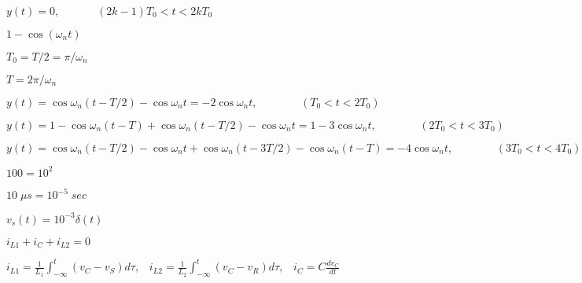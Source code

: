\documentclass{article}
\def\lthtmlcheckvsize{\ifdim\ht\sizebox<\vsize 
  \ifdim\wd\sizebox<\hsize\expandafter\hfill\fi \expandafter\vfill
  \else\expandafter\vss\fi}%
\begin{document}
{\newpage\clearpage
{}%
$\displaystyle y(t)=0,\;\;\;\;\;\;\;\;\;\;\;\;(2k-1)T_0<t<2kT_0$%
\lthtmlindisplaymathZ
\lthtmlcheckvsize\clearpage}

{\newpage\clearpage
{}%
$ 1-\cos(\omega_nt)$%
\lthtmlindisplaymathZ
\lthtmlcheckvsize\clearpage}

{\newpage\clearpage
{}%
$ T_0=T/2=\pi/\omega_n$%
\lthtmlindisplaymathZ
\lthtmlcheckvsize\clearpage}

{\newpage\clearpage
{}%
$ T=2\pi/\omega_n$%
\lthtmlindisplaymathZ
\lthtmlcheckvsize\clearpage}

{\newpage\clearpage
{}%
$\displaystyle y(t)=\cos\omega_n(t-T/2)-\cos\omega_nt=-2\cos\omega_nt,
\;\;\;\;\;\;\;\;\;\;\;\;\;\;(T_0<t<2T_0)$%
\lthtmlindisplaymathZ
\lthtmlcheckvsize\clearpage}

{\newpage\clearpage
{}%
$\displaystyle y(t)=1-\cos\omega_n(t-T)+\cos\omega_n(t-T/2)-\cos\omega_nt
=1-3\cos\omega_nt,\;\;\;\;\;\;\;\;\;\;\;\;\;\;(2T_0<t<3T_0)$%
\lthtmlindisplaymathZ
\lthtmlcheckvsize\clearpage}

{\newpage\clearpage
{}%
$\displaystyle y(t)=\cos\omega_n(t-T/2)-\cos\omega_nt+\cos\omega_n(t-3T/2)-\cos\omega_n(t-T)=-4\cos\omega_nt,\;\;\;\;\;\;\;\;\;\;\;\;\;\;(3T_0<t<4T_0)$%
\lthtmlindisplaymathZ
\lthtmlcheckvsize\clearpage}

{\newpage\clearpage
{}%
$ 100=10^2$%
\lthtmlindisplaymathZ
\lthtmlcheckvsize\clearpage}

{\newpage\clearpage
{}%
$ 10 \;\mu s=10^{-5}\;sec$%
\lthtmlindisplaymathZ
\lthtmlcheckvsize\clearpage}

{\newpage\clearpage
{}%
$ v_s(t)=10^{-3}\delta(t)$%
\lthtmlindisplaymathZ
\lthtmlcheckvsize\clearpage}

{\newpage\clearpage
{}%
$ i_{L1}+i_C+i_{L2}=0$%
\lthtmlindisplaymathZ
\lthtmlcheckvsize\clearpage}

{\newpage\clearpage
{}%
$\displaystyle i_{L1}=\frac{1}{L_1}\int_{-\infty}^t (v_C-v_S)d\tau,\;\;\;
i_{L2}=\frac{1}{L_2}\int_{-\infty}^t (v_C-v_R)d\tau,\;\;\;
i_C=C\frac{dv_C}{dt}$%
\lthtmlindisplaymathZ
\lthtmlcheckvsize\clearpage}
\end{document}
